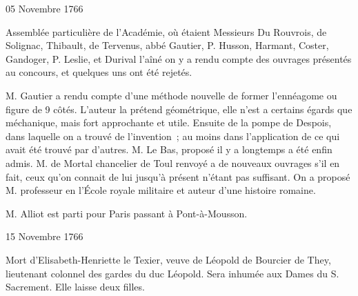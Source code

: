                      \begin{diary}{05 Novembre 1766}{}
                        
                         Assemblée particulière de l’Académie, où
                           étaient Messieurs
                           Du Rouvrois, de Solignac, Thibault,
                           de Tervenus, abbé Gautier, P.
                              Husson, Harmant,
                           Coster, Gandoger, P. Leslie, et
                              Durival l'aîné
                           on y a rendu compte des ouvrages présentés
                           au concours, et quelques uns ont été rejetés. \bigskip
        
        

                        
                           M. Gautier a rendu compte d’une
                           méthode nouvelle
                           de former l’ennéagome ou figure de 9 côtés.
                           L’auteur la prétend géométrique, elle n’est a certains
                           égards que méchanique, mais fort approchante et
                           utile. Ensuite de la pompe de Despois, dans
                           laquelle on a trouvé de l’invention ; au moins
                           dans l’application de ce qui avait été trouvé
                           par d’autres. M. Le Bas, proposé
                           il y a
                           longtemps a été enfin admis. M. de
                              Mortal
                           chancelier de Toul renvoyé a de nouveaux ouvrages
                           s’il en fait, ceux qu’on connait de lui jusqu’à
                           présent n’étant pas suffisant. On a proposé
                           M.  professeur en l’École royale
                              militaire
                           et auteur d’une histoire romaine. \bigskip
        
        
                        
                           M. Alliot est parti pour Paris passant à Pont-à-Mousson. \bigskip
        
        
                     \end{diary}
                     

                     \begin{diary}{15 Novembre 1766}{}
                        
                         Mort d’Elisabeth-Henriette le Texier, veuve
                           de Léopold de Bourcier de
                              They, lieutenant colonnel
                           des gardes du duc Léopold.
                           Sera inhumée
                           aux Dames du S.
                              Sacrement. Elle laisse
                           deux filles. \bigskip
        
        
                     \end{diary}

